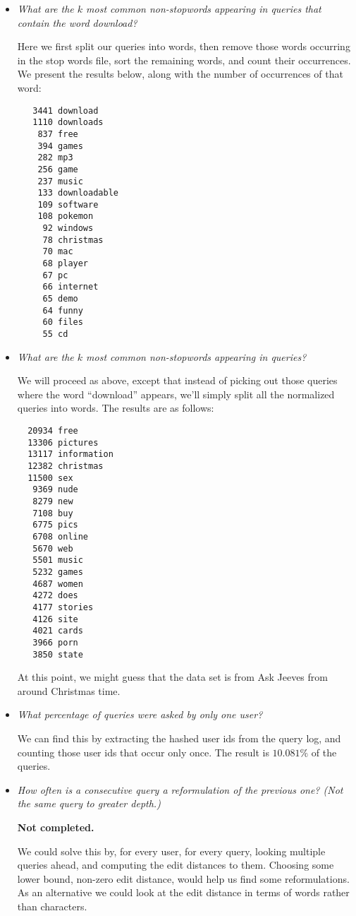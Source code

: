 \begin{itemize}
\item \emph{What are the $k$ most common non-stopwords appearing in queries
that contain the word download?}

Here we first split our queries into words, then remove those words occurring
in the stop words file, sort the remaining words, and count their occurrences.
We present the results below, along with the number of occurrences of that
word:

\begin{lstlisting}
   3441 download
   1110 downloads
    837 free
    394 games
    282 mp3
    256 game
    237 music
    133 downloadable
    109 software
    108 pokemon
     92 windows
     78 christmas
     70 mac
     68 player
     67 pc
     66 internet
     65 demo
     64 funny
     60 files
     55 cd
\end{lstlisting}

\item \emph{What are the $k$ most common non-stopwords appearing in queries?}

We will proceed as above, except that instead of picking out those queries
where the word ``download'' appears, we'll simply split all the normalized
queries into words. The results are as follows:

\begin{lstlisting}
  20934 free
  13306 pictures
  13117 information
  12382 christmas
  11500 sex
   9369 nude
   8279 new
   7108 buy
   6775 pics
   6708 online
   5670 web
   5501 music
   5232 games
   4687 women
   4272 does
   4177 stories
   4126 site
   4021 cards
   3966 porn
   3850 state
\end{lstlisting}

At this point, we might guess that the data set is from Ask Jeeves from around
Christmas time.

\item \emph{What percentage of queries were asked by only one user?}

We can find this by extracting the hashed user ids from the query log, and
counting those user ids that occur only once. The result is $10.081\%$ of the
queries.

\item \emph{How often is a consecutive query a reformulation of the previous
one? (Not the same query to greater depth.)}

\textbf{Not completed.}

We could solve this by, for every user, for every query, looking multiple
queries ahead, and computing the edit distances\cite[.3 (pp.
58--60)]{irbook} to them. Choosing some lower bound, non-zero edit distance,
would help us find some reformulations. As an alternative we could look at the
edit distance in terms of words rather than characters.


\end{itemize}
